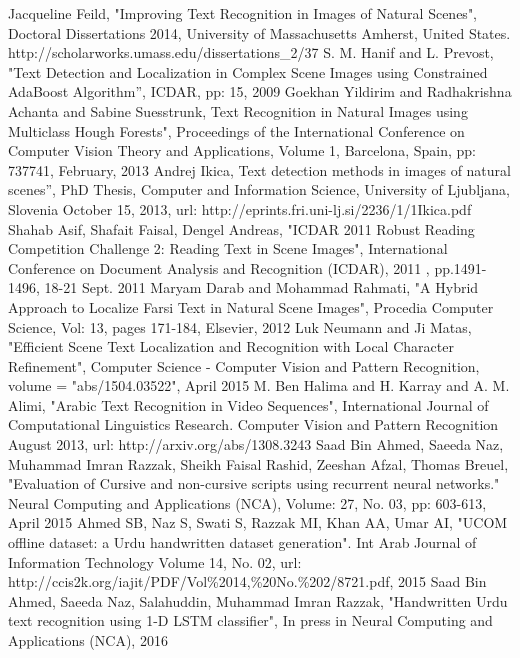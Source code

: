 \documentclass[conference]{IEEEtran}
\begin{document}
\begin{thebibliography}{1}



Jacqueline Feild, "Improving Text Recognition in Images of Natural Scenes", Doctoral Dissertations 2014, University of Massachusetts Amherst, United States. http://scholarworks.umass.edu/dissertations\_2/37
S. M. Hanif and L. Prevost, "Text Detection and Localization in Complex Scene Images using Constrained AdaBoost Algorithm”, ICDAR, pp: 15, 2009
Goekhan Yildirim and Radhakrishna Achanta and  Sabine Suesstrunk, Text Recognition in Natural Images using Multiclass Hough Forests", Proceedings of the International Conference on Computer Vision Theory and Applications, Volume 1, Barcelona, Spain, pp: 737741, February, 2013
Andrej Ikica, Text detection methods in images of natural scenes”, PhD Thesis, Computer and Information Science, University of Ljubljana, Slovenia  October 15, 2013, url: http://eprints.fri.uni-lj.si/2236/1/1Ikica.pdf
Shahab Asif, Shafait Faisal, Dengel Andreas, "ICDAR 2011 Robust Reading Competition Challenge 2: Reading Text in Scene Images", International Conference on Document Analysis and Recognition (ICDAR), 2011 , pp.1491-1496, 18-21 Sept. 2011
Maryam Darab and Mohammad Rahmati, "A Hybrid Approach to Localize Farsi Text in Natural Scene Images",  Procedia Computer Science, Vol: 13, pages 171-184, Elsevier, 2012
Luk Neumann and Ji Matas, "Efficient Scene Text Localization and Recognition with Local Character Refinement", Computer Science - Computer Vision and Pattern Recognition, volume = "abs/1504.03522", April 2015
 M. Ben Halima and H. Karray and A. M. Alimi, "Arabic Text Recognition in Video Sequences", International Journal of Computational Linguistics Research. Computer Vision and Pattern Recognition  August 2013, url: http://arxiv.org/abs/1308.3243
Saad Bin Ahmed, Saeeda Naz, Muhammad Imran Razzak, Sheikh Faisal Rashid, Zeeshan Afzal, Thomas Breuel, "Evaluation of Cursive and non-cursive scripts using recurrent neural networks." Neural Computing and Applications (NCA), Volume: 27, No. 03, pp: 603-613, April 2015
Ahmed SB, Naz S, Swati S, Razzak MI, Khan AA, Umar AI, "UCOM offline dataset: a Urdu handwritten dataset generation". Int Arab Journal of Information Technology Volume 14, No. 02, url:  http://ccis2k.org/iajit/PDF/Vol\%2014,\%20No.\%202/8721.pdf,	2015
Saad Bin Ahmed, Saeeda Naz, Salahuddin, Muhammad Imran Razzak, "Handwritten Urdu text recognition using 1-D LSTM classifier", In press in Neural Computing and Applications (NCA), 2016

\end{thebibliography}
\end{document}
